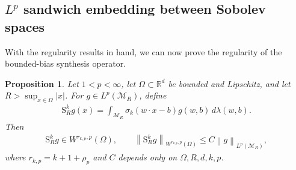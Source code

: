 \documentclass[12pt]{article}
\numberwithin{equation}{section}
\newtheorem{proposition}{Proposition}[section]
\numberwithin{figure}{section}
\numberwithin{equation}{section}
\newcommand{\R}{\mathbb{R}}
\newcommand{\MR}{\mathcal M_R}
\newcommand{\norm}[1]{\left\|#1\right\|}
\begin{document}
\subsection{\texorpdfstring{$L^p$}{Lp} sandwich embedding between Sobolev spaces}
With the regularity results in hand, we can now prove the regularity of the bounded-bias 
synthesis operator.
\begin{proposition}
\label{prop:ridge-integral-regularity-lp}
Let $1<p<\infty$, let $\Omega\subset\R^d$ be bounded and Lipschitz, and let
$R>\sup_{x\in\Omega}|x|$.  For $g\in L^p(\MR)$, define
\begin{align*}
    \mathrm{S}^k_R g(x)=\int_{\MR}\sigma_k(w\cdot x-b)g(w,b)\,d\lambda(w,b).
\end{align*}
Then
\begin{align}
    \mathrm{S}^k_R g\in W^{r_{k,p},p}(\Omega),
    \qquad
    \norm{\mathrm{S}^k_R g}_{W^{r_{k,p},p}(\Omega)}
    \le C\norm{g}_{L^p(\MR)},
    \label{eq:AR-regularity-lp}
\end{align}
where $r_{k,p}=k+1+\rho_p$ and $C$ depends only on $\Omega,R,d,k,p$.
\end{proposition}
\end{document}
